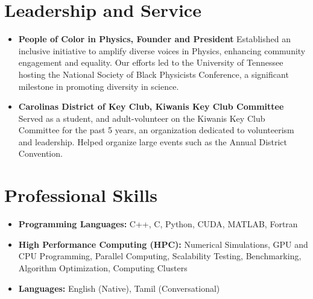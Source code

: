 \documentclass[10pt,a4paper,sans]{moderncv}
\begin{document}

\section{Leadership and Service}
\begin{itemize}[leftmargin=*]
\item \textbf{People of Color in Physics, Founder and President} Established an inclusive initiative to amplify diverse voices in Physics, enhancing community engagement and equality. Our efforts led to the University of Tennessee hosting the National Society of Black Physicists Conference, a significant milestone in promoting diversity in science.
\item \textbf{Carolinas District of Key Club, Kiwanis Key Club Committee} Served as a student, and adult-volunteer on the Kiwanis Key Club Committee for the past 5 years, an organization dedicated to volunteerism and leadership. Helped organize large events such as the Annual District Convention.
\end{itemize}

\section{Professional Skills}
\begin{itemize}
\item \textbf{Programming Languages:} C++, C, Python, CUDA, MATLAB, Fortran
\item \textbf{High Performance Computing (HPC):} Numerical Simulations, GPU and CPU Programming, Parallel Computing, Scalability Testing, Benchmarking, Algorithm Optimization, Computing Clusters
\item \textbf{Languages:} English (Native), Tamil (Conversational)
\end{itemize}


\end{document}
